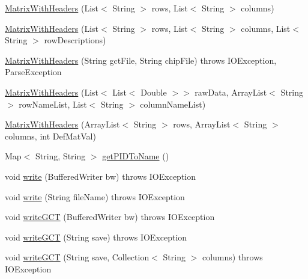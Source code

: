 \begin{DoxyCompactItemize}
\hyperlink{classbroad_1_1core_1_1datastructures_1_1_matrix_with_headers_a616b3e387e95384ade93e142da018efd}{Matrix\+With\+Headers} (List$<$ String $>$ rows, List$<$ String $>$ columns)
\item 
\hyperlink{classbroad_1_1core_1_1datastructures_1_1_matrix_with_headers_ac28d1d56d5a463e6e452bd93ad7475c3}{Matrix\+With\+Headers} (List$<$ String $>$ rows, List$<$ String $>$ columns, List$<$ String $>$ row\+Descriptions)
\item 
\hyperlink{classbroad_1_1core_1_1datastructures_1_1_matrix_with_headers_a2d883c3d2eeca752ec237ba9ba60f104}{Matrix\+With\+Headers} (String gct\+File, String chip\+File)  throws I\+O\+Exception, Parse\+Exception 
\item 
\hyperlink{classbroad_1_1core_1_1datastructures_1_1_matrix_with_headers_afed9593664e9affd493444b3f5aff1b5}{Matrix\+With\+Headers} (List$<$ List$<$ Double $>$$>$ raw\+Data, Array\+List$<$ String $>$ row\+Name\+List, List$<$ String $>$ column\+Name\+List)
\item 
\hyperlink{classbroad_1_1core_1_1datastructures_1_1_matrix_with_headers_aca82e43916615857809977266c76ac8c}{Matrix\+With\+Headers} (Array\+List$<$ String $>$ rows, Array\+List$<$ String $>$ columns, int Def\+Mat\+Val)
\item 
Map$<$ String, String $>$ \hyperlink{classbroad_1_1core_1_1datastructures_1_1_matrix_with_headers_a2f79f7b9a68bf397ebb2c5984c1bf4b3}{get\+P\+I\+D\+To\+Name} ()
\item 
void \hyperlink{classbroad_1_1core_1_1datastructures_1_1_matrix_with_headers_a99b5447733678b351e433e844a8b2167}{write} (Buffered\+Writer bw)  throws I\+O\+Exception 
\item 
void \hyperlink{classbroad_1_1core_1_1datastructures_1_1_matrix_with_headers_afd228b07cf349423656f1d1c76eaca05}{write} (String file\+Name)  throws I\+O\+Exception 
\item 
void \hyperlink{classbroad_1_1core_1_1datastructures_1_1_matrix_with_headers_a06e075f732e997e949921997379c31f8}{write\+G\+C\+T} (Buffered\+Writer bw)  throws I\+O\+Exception 
\item 
void \hyperlink{classbroad_1_1core_1_1datastructures_1_1_matrix_with_headers_ab2da90de3c1b3c1e939ae6990d64cb5e}{write\+G\+C\+T} (String save)  throws I\+O\+Exception 
\item 
void \hyperlink{classbroad_1_1core_1_1datastructures_1_1_matrix_with_headers_a5695ffe4622b211ee8342a195746052a}{write\+G\+C\+T} (String save, Collection$<$ String $>$ columns)  throws I\+O\+Exception 
\item 
$$
\end{DoxyCompactItemize}
